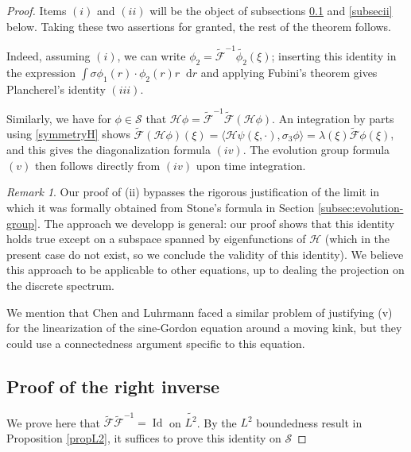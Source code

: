 \documentclass[11 pt]{amsart}
\theoremstyle{definition}
\theoremstyle{remark}
\newtheorem{rem}[thm]{Remark}
\numberwithin{equation}{section}
\newcommand{\dd}{\mathop{}\!\mathrm{d}}
\begin{document}
\begin{proof} 

Items $(i)$ and $(ii)$ will be the object of subsections \ref{subseci} and \ref{subsecii} below. Taking these two assertions for granted, the rest of the theorem follows. 

Indeed, assuming $(i)$, we can write $\phi_2 = \widetilde{\mathcal{F}}^{-1} \widetilde{\phi_2}(\xi)$; inserting this identity in the expression $\int \sigma \phi_1(r) \cdot \phi_2(r) r \dd r$ and applying Fubini's theorem gives Plancherel's identity $(iii)$.

Similarly, we have for $\phi \in \mathcal{S}$ that 
$\mathcal H \phi=\widetilde{\mathcal{F}}^{-1} \widetilde{\mathcal{F}} (\mathcal H\phi)$.  An integration by parts using \eqref{symmetryH} shows $\widetilde{\mathcal F}(\mathcal H\phi)(\xi)=\langle \mathcal H \psi(\xi,\cdot),\sigma_3 \phi\rangle=\lambda(\xi)\widetilde{\mathcal F} \phi (\xi)$, and this gives the diagonalization formula $(iv)$.
The evolution group formula $(v)$ then follows directly from $(iv)$ upon time integration.


\begin{rem}
Our proof of (ii) bypasses the rigorous justification of the limit in which it was formally obtained from Stone's formula in Section \ref{subsec:evolution-group}. The approach we developp is general: our proof shows that this identity holds true except on a subspace spanned by eigenfunctions of $\mathcal H$ (which in the present case do not exist, so we conclude the validity of this identity). We believe this approach to be applicable to other equations, up to dealing the projection on the discrete spectrum.

We mention that Chen and Luhrmann \cite{ChenLuhrmann} faced a similar problem of justifying (v) for the linearization of the sine-Gordon equation around a moving kink, but they could use a connectedness argument specific to this equation.
\end{rem}


\subsection{Proof of the right inverse}

\label{subseci}

We prove here that $ \widetilde{\mathcal{F}} \widetilde{\mathcal{F}}^{-1} = \operatorname{Id}$ on $\widetilde{L^2}$. By the $L^2$ boundedness result in Proposition \ref{propL2}, it suffices to prove this identity on $\mathcal{S}$


\end{proof}
\end{document}
